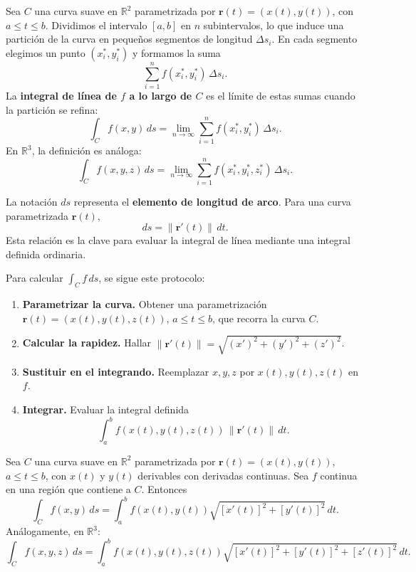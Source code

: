 \begin{definition}
Sea \(C\) una curva suave en \(\mathbb{R}^2\) parametrizada por
\(\mathbf{r}(t) = (x(t), y(t))\), con \(a \le t \le b\). Dividimos
el intervalo \([a,b]\) en \(n\) subintervalos, lo que induce una
partición de la curva en pequeños segmentos de longitud \(\Delta s_i\).
En cada segmento elegimos un punto \((x_i^*, y_i^*)\) y formamos la
suma
\[
\sum_{i=1}^n f(x_i^*, y_i^*) \,\Delta s_i.
\]
La \textbf{integral de línea de \(f\) a lo largo de \(C\)} es el
límite de estas sumas cuando la partición se refina:
\[
\int_C f(x,y)\,ds = \lim_{n\to\infty}
\sum_{i=1}^n f(x_i^*, y_i^*) \,\Delta s_i.
\]
En \(\mathbb{R}^3\), la definición es análoga:
\[
\int_C f(x,y,z)\,ds = \lim_{n\to\infty}
\sum_{i=1}^n f(x_i^*, y_i^*, z_i^*) \,\Delta s_i.
\]
\end{definition}
\begin{rem}
La notación \(ds\) representa el \textbf{elemento de longitud de
arco}. Para una curva parametrizada \(\mathbf{r}(t)\),
\[
ds = \|\mathbf{r}'(t)\|\,dt.
\]
Esta relación es la clave para evaluar la integral de línea mediante
una integral definida ordinaria.
\end{rem}

\begin{pasos}
Para calcular \(\int_C f\,ds\), se sigue este protocolo:
\begin{enumerate}
  \item \textbf{Parametrizar la curva.} Obtener una parametrización
  \(\mathbf{r}(t) = (x(t), y(t), z(t))\), \(a \le t \le b\), que
  recorra la curva \(C\).
  \item \textbf{Calcular la rapidez.} Hallar
  \(\|\mathbf{r}'(t)\| = \sqrt{(x')^2 + (y')^2 + (z')^2}\).
  \item \textbf{Sustituir en el integrando.} Reemplazar \(x,y,z\) por
  \(x(t),y(t),z(t)\) en \(f\).
  \item \textbf{Integrar.} Evaluar la integral definida
  \[
  \int_a^b f(x(t),y(t),z(t)) \,\|\mathbf{r}'(t)\|\,dt.
  \]
\end{enumerate}
\end{pasos}

\begin{theorem}
Sea \(C\) una curva suave en \(\mathbb{R}^2\) parametrizada por
\(\mathbf{r}(t) = (x(t), y(t))\), \(a \le t \le b\), con \(x(t)\) y
\(y(t)\) derivables con derivadas continuas. Sea \(f\) continua en
una región que contiene a \(C\). Entonces
\[
\int_C f(x,y)\,ds =
\int_a^b f(x(t), y(t)) \sqrt{[x'(t)]^2 + [y'(t)]^2}\,dt.
\]
Análogamente, en \(\mathbb{R}^3\):
\[
\int_C f(x,y,z)\,ds =
\int_a^b f(x(t), y(t), z(t)) \sqrt{[x'(t)]^2 + [y'(t)]^2 + [z'(t)]^2}\,dt.
\]
\end{theorem}

